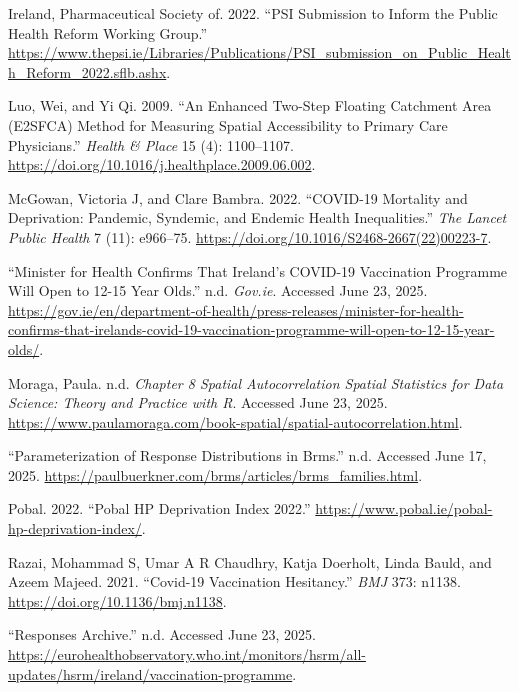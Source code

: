 \documentclass{article}
\newlength{\cslhangindent}
\newenvironment{CSLReferences}[2] %
 {\begin{list}{}{%
  \setlength{\itemindent}{0pt}
  \setlength{\leftmargin}{0pt}
  \setlength{\parsep}{0pt}
  \ifodd #1
   \setlength{\leftmargin}{\cslhangindent}
   \setlength{\itemindent}{-1\cslhangindent}
  \fi
  \setlength{\itemsep}{#2\baselineskip}}}
 {\end{list}}
\begin{document}
\begin{CSLReferences}{1}{0}
Ireland, Pharmaceutical Society of. 2022. {``PSI Submission to Inform
the Public Health Reform Working Group.''}
\url{https://www.thepsi.ie/Libraries/Publications/PSI_submission_on_Public_Health_Reform_2022.sflb.ashx}.

Luo, Wei, and Yi Qi. 2009. {``An Enhanced Two-Step Floating Catchment
Area ({E2SFCA}) Method for Measuring Spatial Accessibility to Primary
Care Physicians.''} \emph{Health \& Place} 15 (4): 1100--1107.
\url{https://doi.org/10.1016/j.healthplace.2009.06.002}.

McGowan, Victoria J, and Clare Bambra. 2022. {``{COVID}-19 Mortality and
Deprivation: Pandemic, Syndemic, and Endemic Health Inequalities.''}
\emph{The Lancet Public Health} 7 (11): e966--75.
\url{https://doi.org/10.1016/S2468-2667(22)00223-7}.

{``Minister for {Health} Confirms That {Ireland}'s {COVID}-19
{Vaccination} {Programme} Will Open to 12-15 Year Olds.''} n.d.
\emph{Gov.ie}. Accessed June 23, 2025.
\url{https://gov.ie/en/department-of-health/press-releases/minister-for-health-confirms-that-irelands-covid-19-vaccination-programme-will-open-to-12-15-year-olds/}.

Moraga, Paula. n.d. \emph{Chapter 8 {Spatial} Autocorrelation {\textbar}
{Spatial} {Statistics} for {Data} {Science}: {Theory} and {Practice}
with {R}}. Accessed June 23, 2025.
\url{https://www.paulamoraga.com/book-spatial/spatial-autocorrelation.html}.

{``Parameterization of {Response} {Distributions} in Brms.''} n.d.
Accessed June 17, 2025.
\url{https://paulbuerkner.com/brms/articles/brms_families.html}.

Pobal. 2022. {``Pobal HP Deprivation Index 2022.''}
\url{https://www.pobal.ie/pobal-hp-deprivation-index/}.

Razai, Mohammad S, Umar A R Chaudhry, Katja Doerholt, Linda Bauld, and
Azeem Majeed. 2021. {``Covid-19 Vaccination Hesitancy.''} \emph{BMJ}
373: n1138. \url{https://doi.org/10.1136/bmj.n1138}.

{``Responses Archive.''} n.d. Accessed June 23, 2025.
\url{https://eurohealthobservatory.who.int/monitors/hsrm/all-updates/hsrm/ireland/vaccination-programme}.


\end{CSLReferences}
\end{document}
